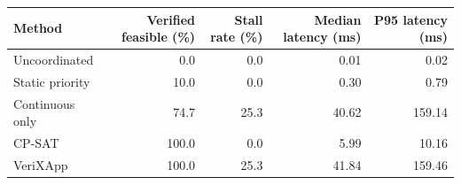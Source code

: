 \begin{tabular}{lrrrr}
\toprule
Method & Verified feasible (\%) & Stall rate (\%) & Median latency (ms) & P95 latency (ms) \\
\midrule
Uncoordinated & 0.0 & 0.0 & 0.01 & 0.02 \\
Static priority & 10.0 & 0.0 & 0.30 & 0.79 \\
Continuous only & 74.7 & 25.3 & 40.62 & 159.14 \\
CP-SAT & 100.0 & 0.0 & 5.99 & 10.16 \\
VeriXApp & 100.0 & 25.3 & 41.84 & 159.46 \\
\bottomrule
\end{tabular}
